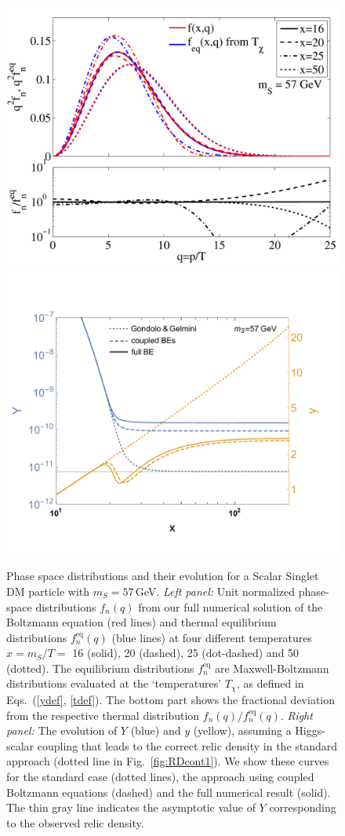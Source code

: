 \documentclass[twocolumn,showpacs,amsmath,amssymb,superscriptaddress,nofootinbib]{revtex4-1}
\begin{document}
\begin{figure}
  \includegraphics[width=0.9\columnwidth]{phasespace_distr_mDM57_kCM}
  \hspace*{2cm}
  \includegraphics[trim={3.25cm 1.5cm 3.25cm 1.5cm}, width=0.673\columnwidth]{Yyx_mDM57_main}
  \hspace*{0.75cm}
  \caption{Phase space distributions and their evolution for  a Scalar Singlet DM particle with $m_S=57$\,GeV. 
  {\it Left panel:} Unit normalized phase-space distributions $f_n(q)$ from our full numerical solution of the
  Boltzmann equation 
  (red lines) and thermal equilibrium distributions  $f^\text{eq}_n(q)$ (blue lines) at four different 
  temperatures $x = m_S/T = $ 16 (solid), 20  (dashed), 25 (dot-dashed) and 50 (dotted).  The equilibrium 
  distributions  $f^\text{eq}_n$ are Maxwell-Boltzmann distributions evaluated at the 
  `temperatures' $T_\chi$, as defined in  Eqs.~(\ref{ydef}, \ref{tdef}). The bottom part shows 
  the fractional deviation from the respective thermal distribution $f_n(q) / f_n^\text{eq}(q)$. 
  {\it Right panel:} The evolution of $Y$ (blue) and $y$ (yellow), assuming a Higgs-scalar coupling that 
  leads to the correct relic density in the standard approach (dotted line in Fig.~\ref{fig:RDcont1}).
  We show these curves for the standard case (dotted lines), the approach using coupled Boltzmann 
  equations (dashed) and the full numerical result (solid). The thin gray line indicates the asymptotic 
  value of $Y$ corresponding to the observed relic density.
}
    \label{fig:PSdist}
\end{figure}
\end{document}
